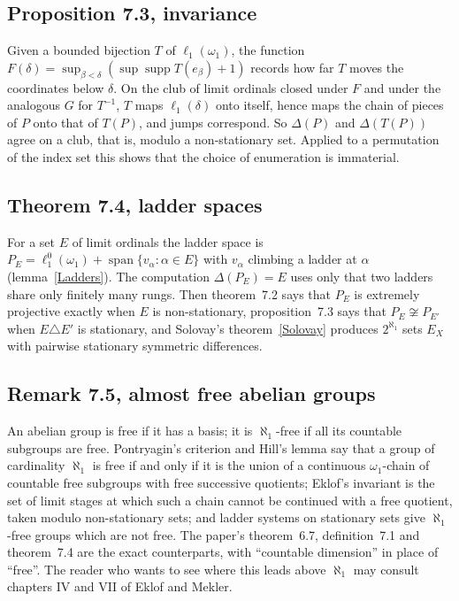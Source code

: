\documentclass[12pt]{article}
\theoremstyle{definition}
\theoremstyle{remark}
\newcommand{\lo}[1]{\ell_1^0(#1)}
\newcommand{\ellone}[1]{\ell_1(#1)}
\newcommand{\supp}{\operatorname{supp}}
\newcommand{\Lin}{\operatorname{span}}
\begin{document}
\subsection*{Proposition 7.3, invariance}

Given a bounded bijection $T$ of $\ellone{\omega_1}$, the function
$F(\delta)=\sup_{\beta<\delta}(\sup\supp T(e_\beta)+1)$ records how far $T$
moves the coordinates below $\delta$. On the club of limit ordinals closed
under $F$ and under the analogous $G$ for $T^{-1}$, $T$ maps $\ellone{\delta}$
onto itself, hence maps the chain of pieces of $P$ onto that of $T(P)$, and
jumps correspond. So $\Delta(P)$ and $\Delta(T(P))$ agree on a club, that is,
modulo a non-stationary set. Applied to a permutation of the index set this
shows that the choice of enumeration is immaterial.

\subsection*{Theorem 7.4, ladder spaces}

For a set $E$ of limit ordinals the ladder space is
$P_E=\lo{\omega_1}+\Lin\{v_\alpha:\alpha\in E\}$ with $v_\alpha$ climbing a
ladder at $\alpha$ (lemma~\ref{Ladders}). The computation
$\Delta(P_E)=E$ uses only that two ladders share only finitely many rungs. Then
theorem~7.2 says that $P_E$ is extremely projective exactly when $E$ is
non-stationary, proposition~7.3 says that $P_E\not\cong P_{E'}$ when
$E\triangle E'$ is stationary, and Solovay's theorem~\ref{Solovay} produces
$2^{\aleph_1}$ sets $E_X$ with pairwise stationary symmetric differences.

\subsection*{Remark 7.5, almost free abelian groups}

An abelian group is free if it has a basis; it is $\aleph_1$-free if all its
countable subgroups are free. Pontryagin's criterion and Hill's lemma say
that a group of cardinality $\aleph_1$ is free if and only if it is the union
of a continuous $\omega_1$-chain of countable free subgroups with free
successive quotients; Eklof's invariant is the set of limit stages at which
such a chain cannot be continued with a free quotient, taken modulo
non-stationary sets; and ladder systems on stationary sets give
$\aleph_1$-free groups which are not free. The paper's theorem~6.7,
definition~7.1 and theorem~7.4 are the exact counterparts, with ``countable
dimension'' in place of ``free''. The reader who wants to see where this
leads above $\aleph_1$ may consult chapters IV and VII of Eklof and Mekler.
\end{document}

